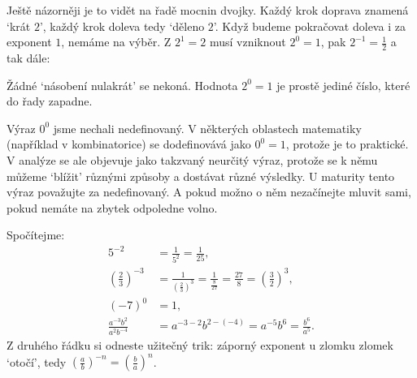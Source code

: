 Ještě názorněji je to vidět na řadě mocnin dvojky. Každý krok doprava znamená `krát $2$', každý krok doleva tedy `děleno $2$'. Když budeme pokračovat doleva i za exponent $1$, nemáme na výběr. Z $2^1 = 2$ musí vzniknout $2^0 = 1$, pak $2^{-1} = \frac{1}{2}$ a tak dále:
\begin{center}
\end{center}
Žádné `násobení nulakrát' se nekoná. Hodnota $2^0 = 1$ je prostě jediné číslo, které do řady zapadne.

\begin{note}
  Výraz $0^0$ jsme nechali nedefinovaný. V některých oblastech matematiky (například v kombinatorice) se dodefinovává jako $0^0 = 1$, protože je to praktické. V analýze se ale objevuje jako takzvaný neurčitý výraz, protože se k němu můžeme `blížit' různými způsoby a dostávat různé výsledky. U maturity tento výraz považujte za nedefinovaný. A pokud možno o něm nezačínejte mluvit sami, pokud nemáte na zbytek odpoledne volno.
\end{note}

\begin{example}
  Spočítejme:
  \begin{align*}
    5^{-2} &= \frac{1}{5^2} = \frac{1}{25},\\
    {\left(\frac{2}{3}\right)}^{-3} &= \frac{1}{{\left(\frac{2}{3}\right)}^3} = \frac{1}{\frac{8}{27}} = \frac{27}{8} = {\left(\frac{3}{2}\right)}^3,\\
    {(-7)}^0 &= 1,\\
    \frac{a^{-3}b^2}{a^2b^{-4}} &= a^{-3-2}b^{2-(-4)} = a^{-5}b^6 = \frac{b^6}{a^5}.
  \end{align*}
  Z druhého řádku si odneste užitečný trik: záporný exponent u zlomku zlomek `otočí', tedy ${\left(\frac{a}{b}\right)}^{-n} = {\left(\frac{b}{a}\right)}^{n}$.
\end{example}

